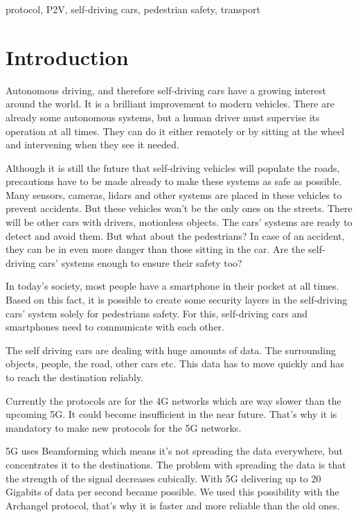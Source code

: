 \documentclass[conference]{IEEEtran}
\begin{document}
\begin{IEEEkeywords}
    protocol, P2V, self-driving cars, pedestrian safety, transport
\end{IEEEkeywords}

\section{Introduction}
Autonomous driving, and therefore self-driving cars have a growing interest around the world. It is a brilliant improvement to modern vehicles. There are already some autonomous systems, but a human driver must supervise its operation at all times. They can do it either remotely or by sitting at the wheel and intervening when they see it needed.

Although it is still the future that self-driving vehicles will populate the roads, precautions have to be made already to make these systems as safe as possible. Many sensors, cameras, lidars and other systems are placed in these vehicles to prevent accidents. But these vehicles won't be the only ones on the streets. There will be other cars with drivers, motionless objects. The cars' systems are ready to detect and avoid them. But what about the pedestrians? In case of an accident, they can be in even more danger than those sitting in the car. Are the self-driving cars' systems enough to ensure their safety too?

In today's society, most people have a smartphone in their pocket at all times. Based on this fact, it is possible to create some security layers in the self-driving cars' system solely for pedestrians safety. For this, self-driving cars and smartphones need to communicate with each other.

The self driving cars are dealing with huge amounts of data. The surrounding objects, people, the road, other cars etc. This data has to move quickly and has to reach the destination reliably.

Currently the protocols are for the 4G networks which are way slower than the upcoming 5G. It could become insufficient in the near future. That's why it is mandatory to make new protocols for the 5G networks.

5G uses Beamforming which means it's not spreading the data everywhere, but concentrates it to the destinations. The problem with spreading the data is that the strength of the signal decreases cubically. With 5G delivering up to 20 Gigabits of data per second became possible.
We used this possibility with the Archangel protocol, that's why it is faster and more reliable than the old ones.
\end{document}
